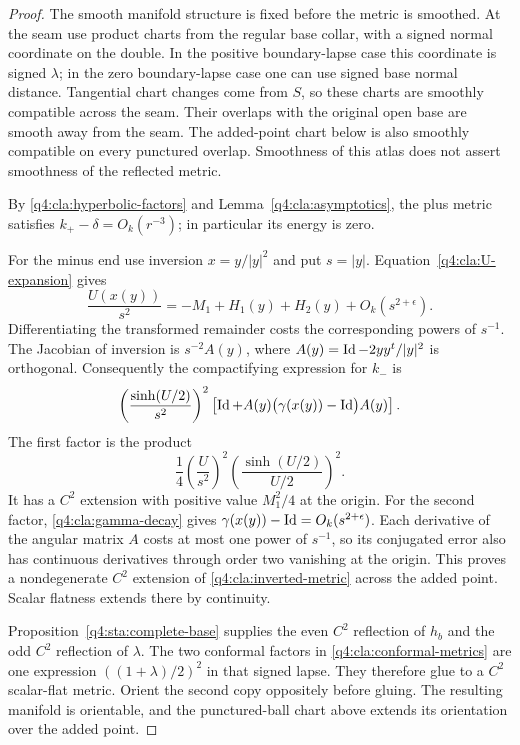 \begin{proof}
The smooth manifold structure is fixed before the metric is smoothed.
At the seam use product charts from the regular base collar, with a
signed normal coordinate on the double.  In the positive boundary-lapse
case this coordinate is signed $\lambda$; in the zero boundary-lapse
case one can use signed base normal distance.  Tangential chart changes
come from $S$, so these charts are smoothly compatible across the seam.
Their overlaps with the original open base are smooth away from the
seam.  The added-point chart below is also smoothly compatible on every
punctured overlap.  Smoothness of this atlas does not assert smoothness
of the reflected metric.

By \eqref{q4:cla:hyperbolic-factors} and
Lemma~\ref{q4:cla:asymptotics}, the plus metric satisfies
$k_+-\delta=O_k(r^{-3})$; in particular its energy is zero.

For the minus end use inversion $x=y/|y|^2$ and put $s=|y|$.
Equation~\eqref{q4:cla:U-expansion} gives
\begin{equation}\label{q4:cla:inverted-lapse}
 \frac{U(x(y))}{s^2}
 =-M_1+H_1(y)+H_2(y)+O_k(s^{2+\epsilon}).
\end{equation}
Differentiating the transformed remainder costs the corresponding
powers of $s^{-1}$.  The Jacobian of inversion is $s^{-2}A(y)$,
where $A(y)=\operatorname{Id}-2yy^t/|y|^2$ is orthogonal.  Consequently the
compactifying expression for $k_-$ is
\begin{equation}\label{q4:cla:inverted-metric}
 \left(\frac{\sinh(U/2)}{s^2}\right)^2
 \left[\operatorname{Id}+A(y)\bigl(\gamma(x(y))-\operatorname{Id}\bigr)A(y)\right].
\end{equation}
The first factor is the product
\[
 \frac14\left(\frac{U}{s^2}\right)^2
       \left(\frac{\sinh(U/2)}{U/2}\right)^2.
\]
It has a $C^2$ extension with positive value $M_1^2/4$ at the origin.
For the second factor, \eqref{q4:cla:gamma-decay} gives
$\gamma(x(y))-\operatorname{Id}=O_k(s^{2+\epsilon})$.
Each derivative of the angular matrix $A$ costs at most one power
of $s^{-1}$, so its conjugated error also has continuous derivatives
through order two vanishing at the origin.  This proves a
nondegenerate $C^2$ extension of \eqref{q4:cla:inverted-metric} across
the added point.  Scalar flatness extends there by continuity.

Proposition~\ref{q4:sta:complete-base} supplies the
even $C^2$ reflection of $h_b$ and the odd $C^2$ reflection of
$\lambda$.  The two conformal factors in
\eqref{q4:cla:conformal-metrics} are one expression
$((1+\lambda)/2)^2$ in that signed lapse.  They therefore glue to a
$C^2$ scalar-flat metric.  Orient the second copy oppositely before
gluing.  The resulting manifold is orientable, and the punctured-ball
chart above extends its orientation over the added point.


\end{proof}

